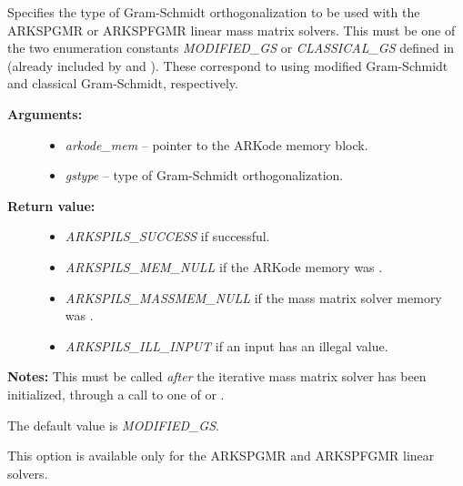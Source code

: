 \documentclass[letterpaper,10pt,english]{sphinxmanual}
\begin{document}

\begin{fulllineitems}
\label{c_interface/User_callable:ARKSpilsSetMassGSType}
Specifies the type of Gram-Schmidt orthogonalization to
be used with the ARKSPGMR or ARKSPFGMR linear mass matrix
solvers. This must be one of the two enumeration constants
\emph{MODIFIED\_GS} or \emph{CLASSICAL\_GS} defined in 
(already included by  and
). These correspond to using modified
Gram-Schmidt and classical Gram-Schmidt, respectively.
\begin{description}
\item[{\textbf{Arguments:}}] \leavevmode\begin{itemize}
\item {} 
\emph{arkode\_mem} -- pointer to the ARKode memory block.

\item {} 
\emph{gstype} -- type of Gram-Schmidt orthogonalization.

\end{itemize}

\item[{\textbf{Return value:}}] \leavevmode\begin{itemize}
\item {} 
\emph{ARKSPILS\_SUCCESS} if successful.

\item {} 
\emph{ARKSPILS\_MEM\_NULL} if the ARKode memory was .

\item {} 
\emph{ARKSPILS\_MASSMEM\_NULL} if the mass matrix solver memory was .

\item {} 
\emph{ARKSPILS\_ILL\_INPUT} if an input has an illegal value.

\end{itemize}

\end{description}

\textbf{Notes:} This must be called \emph{after} the iterative mass matrix
solver has been initialized, through a call to one of
{\hyperref[c_interface/User_callable:ARKMassSpgmr]{}} or {\hyperref[c_interface/User_callable:ARKMassSpfgmr]{}}.

The default value is \emph{MODIFIED\_GS}.

This option is available only for the ARKSPGMR and ARKSPFGMR linear
solvers.

\end{fulllineitems}
\end{document}
